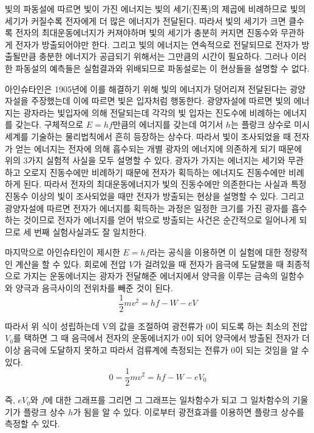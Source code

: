 \documentclass[a4paper]{article}
\begin{document}
	빛의 파동설에 따르면 빛이 가진 에너지는 빛의 세기(진폭)의 제곱에 비례하므로 빛의 세기가 커질수록 전자에게 더 많은 에너지가 전달된다.
	따라서 빛의 세기가 크면 클수록 전자의 최대운동에너지가 커져야하며 빛의 세기가 충분히 커지면 진동수와 무관하게 전자가 방출되어야만 한다.
	그리고 빛의 에너지는 연속적으로 전달되므로 전자가 방출될만큼 충분한 에너지가 공급되기 위해서는 그만큼의 시간이 필요하다.
	그러나 이러한 파동설의 예측들은 실험결과와 위배되므로 파동설로는 이 현상들을 설명할 수 없다.

	아인슈타인은 1905년에 이를 해결하기 위해 빛의 에너지가 덩어리져 전달된다는 광양자설을 주장했는데 이에 따르면 빛은 입자처럼 행동한다.
	광양자설에 따르면 빛의 에너지는 광자라는 빛입자에 의해 전달되는데 각각의 빛 입자는 진도수에 비례하는 에너지를 갖는다.
	구체적으로 $E=hf$만큼의 에너지를 갖는데 여기서 $h$는 플랑크 상수로 미시세계를 기술하는 물리법칙에서 흔히 등장하는 상수다.
	따라서 빛이 조사되었을 때 전자가 얻는 에너지는 전자에 의해 흡수되는 개별 광자의 에너지에 의존하게 되기 때문에 위의 3가지 실험적 사실을 모두 설명할 수 있다.
	광자가 가지는 에너지는 세기와 무관하고 오로지 진동수에만 비례하기 때문에 전자가 획득하는 에너지도 진동수에만 비례하게 된다.
	따라서 전자의 최대운동에너지가 빛의 진동수에만 의존한다는 사실과 특정 진동수 이상의 빛이 조사되었을 때만 전자가 방출되는 현상을 설명할 수 있다.
	그리고 광양자설에 따르면 전자가 에너지를 획득하는 과정은 일정한 크기를 가진 광자를 흡수하는 것이므로 전자가 에너지를 얻어 밖으로 방출되는 사건은 순간적으로 일어나게 되므로 세 번째 실험사실과도 잘 일치한다.

	마지막으로 아인슈타인이 제시한 $E = hf$라는 공식을 이용하면 이 실험에 대한 정량적인 계산을 할 수 있다.
	회로에 전압 $V$가 걸려있을 때 전자가 음극에 도달했을 때 최종적으로 가지는 운동에너지는 광자가 전달해준 에너지에서 양극을 이루는 금속의 일함수와 양극과 음극사이의 전위차를 빼준 것이 된다.
	\begin{equation}
		\frac{1}{2}mv^2 = hf - W - eV
	\end{equation}
	
	따라서 위 식이 성립하는데 V의 값을 조절하여 광전류가 0이 되도록 하는 최소의 전압 $V_0$를 택하면 그 때 음극에서 전자의 운동에너지가 0이 되어 양극에서 방출된 전자가 더 이상 음극에 도달하지 못하고 따라서 검류계에 측정되는 전류가 0이 되는 것임을 알 수 있다.
	\begin{equation}
		0 = \frac{1}{2}mv^2 = hf - W - eV_0
		\label{eq:core}
	\end{equation}

	즉, $eV_0$와 $f$에 대한 그래프를 그리면 그 그래프는 일차함수가 되고 그 일차함수의 기울기가 플랑크 상수 $h$가 됨을 알 수 있다.
	이로부터 광전효과를 이용하면 플랑크 상수를 측정할 수 있다.
\end{document}

